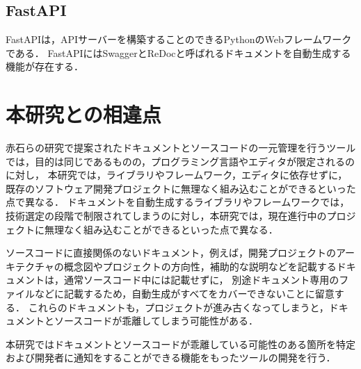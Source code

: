 \subsection{FastAPI}
FastAPIは，APIサーバーを構築することのできるPythonのWebフレームワークである．
FastAPIにはSwaggerとReDocと呼ばれるドキュメントを自動生成する機能が存在する．

\section{本研究との相違点}
赤石らの研究で提案されたドキュメントとソースコードの一元管理を行うツールでは，目的は同じであるものの，プログラミング言語やエディタが限定されるのに対し，
本研究では，ライブラリやフレームワーク，エディタに依存せずに，既存のソフトウェア開発プロジェクトに無理なく組み込むことができるといった点で異なる．
ドキュメントを自動生成するライブラリやフレームワークでは，技術選定の段階で制限されてしまうのに対し，本研究では，現在進行中のプロジェクトに無理なく組み込むことができるといった点で異なる．

ソースコードに直接関係のないドキュメント，例えば，開発プロジェクトのアーキテクチャの概念図やプロジェクトの方向性，補助的な説明などを記載するドキュメントは，通常ソースコード中には記載せずに，
別途ドキュメント専用のファイルなどに記載するため，自動生成がすべてをカバーできないことに留意する．
これらのドキュメントも，プロジェクトが進み古くなってしまうと，ドキュメントとソースコードが乖離してしまう可能性がある．

本研究ではドキュメントとソースコードが乖離している可能性のある箇所を特定および開発者に通知をすることができる機能をもったツールの開発を行う．
